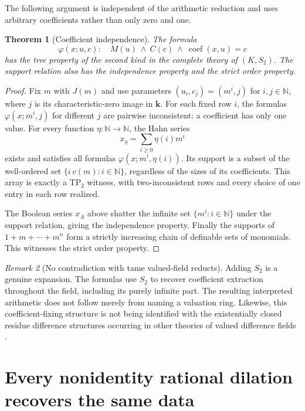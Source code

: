 \documentclass[11pt,oneside]{article}
\numberwithin{equation}{section}
\newtheorem{theorem}{Theorem}[section]
\theoremstyle{definition}
\theoremstyle{remark}
\newtheorem{remark}[theorem]{Remark}
\newcommand{\N}{\mathbb N}
\newcommand{\kk}{\mathbf k}
\newcommand{\coef}{\operatorname{coef}}
\begin{document}
The following argument is independent of the arithmetic reduction and
uses arbitrary coefficients rather than only zero and one.

\begin{theorem}[Coefficient independence]\label{dsup:thm:tp2}
The formula
\[
 \varphi(x;u,c):\quad M(u)\ \land\ C(c)\ \land\ \coef(x,u)=c
\]
has the tree property of the second kind in the complete theory of
$(K,S_2)$. The support relation also has the independence property and
the strict order property.
\end{theorem}
\begin{proof}
Fix $m$ with $J(m)$ and use parameters
$(u_i,c_j)=(m^i,j)$ for $i,j\in\N$, where $j$ is its characteristic-zero
image in $\kk$. For each fixed row $i$, the formulas
$\varphi(x;m^i,j)$ for different $j$ are pairwise inconsistent: a
coefficient has only one value. For every function
$\eta:\N\to\N$, the Hahn series
\[
 x_\eta=\sum_{i\ge0}\eta(i)m^i
\]
exists and satisfies all formulas
$\varphi(x;m^i,\eta(i))$. Its support is a subset of the well-ordered
set $\{i\,v(m):i\in\N\}$, regardless of the sizes of its coefficients.
This array is exactly a $\mathrm{TP}_2$ witness, with two-inconsistent
rows and every choice of one entry in each row realized.

The Boolean series $x_A$ above shatter the infinite set
$\{m^i:i\in\N\}$ under the support relation, giving the independence
property. Finally the supports of
$1+m+\cdots+m^n$ form a strictly increasing chain of definable sets of
monomials. This witnesses the strict order property.
\end{proof}

\begin{remark}[No contradiction with tame valued-field reducts]
Adding $S_2$ is a genuine expansion. The formulas use $S_2$ to recover
coefficient extraction throughout the field, including its purely
infinite part. The resulting interpreted arithmetic does not follow
merely from naming a valuation ring. Likewise, this coefficient-fixing
structure is not being identified with the existentially closed residue
difference structures occurring in other theories of valued difference
fields \cite{Pal}.
\end{remark}

\section{Every nonidentity rational dilation recovers the same data}\label{dsup:sec:alldilations}
\end{document}
